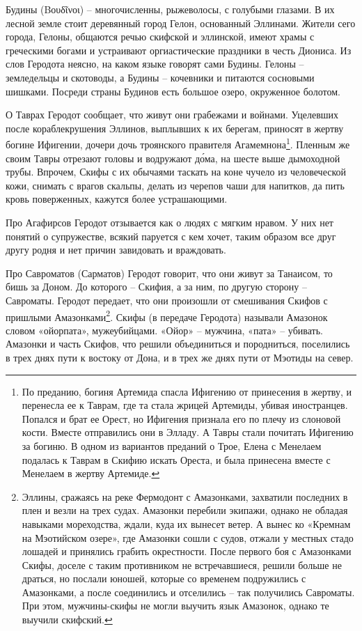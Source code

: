 Будины (Βουδῖνοι) – многочисленны, рыжеволосы, с голубыми глазами. В их лесной земле стоит деревянный город Гелон, основанный Эллинами. Жители сего города, Гелоны, общаются речью скифской и эллинской, имеют храмы с греческими богами и устраивают оргиастические праздники в честь Диониса. Из слов Геродота неясно, на каком языке говорят сами Будины. Гелоны – земледельцы и скотоводы, а Будины – кочевники и питаются сосновыми шишками. Посреди страны Будинов есть большое озеро, окруженное болотом.

О Таврах Геродот сообщает, что живут они грабежами и войнами. Уцелевших после кораблекрушения Эллинов, выплывших к их берегам, приносят в жертву богине Ифигении, дочери дочь троянского правителя Агамемнона\footnote{По преданию, богиня Артемида спасла Ифигению от принесения в жертву, и перенесла ее к Таврам, где та стала жрицей Артемиды, убивая иностранцев. Попался и брат ее Орест, но Ифигения признала его по плечу из слоновой кости. Вместе отправились они в Элладу. А Тавры стали почитать Ифигению за богиню. В одном из вариантов преданий о Трое, Елена с Менелаем подалась к Таврам в Скифию искать Ореста, и была принесена вместе с Менелаем в жертву Артемиде.}. Пленным же своим Тавры отрезают головы и водружают д\'ома, на шесте выше дымоходной трубы. Впрочем, Скифы с их обычаями таскать на коне чучело из человеческой кожи, снимать с врагов скальпы, делать из черепов чаши для напитков, да пить кровь поверженных, кажутся более устрашающими.

Про Агафирсов Геродот отзывается как о людях с мягким нравом. У них нет понятий о супружестве, всякий паруется с кем хочет, таким образом все друг другу родня и нет причин  завидовать и враждовать.

Про Савроматов (Сарматов) Геродот говорит, что они живут за Танаисом, то бишь за Доном. До которого – Скифия, а за ним, по другую сторону – Савроматы. Геродот передает, что они произошли от смешивания Скифов с пришлыми Амазонками\footnote{Эллины, сражаясь на реке Фермодонт с Амазонками, захватили последних в плен и везли на трех судах. Амазонки перебили экипажи, однако не обладая навыками мореходства, ждали, куда их вынесет ветер. А вынес ко «Кремнам на Мэотийском озере», где Амазонки сошли с судов, отжали у местных стадо лошадей и принялись грабить окрестности. После первого боя с Амазонками Скифы, доселе с таким противником не встречавшиеся, решили больше не драться, но послали юношей, которые со временем подружились с Амазонками, а после соединились и отселились – так получились Савроматы. При этом, мужчины-скифы не могли выучить язык Амазонок, однако те выучили скифский.}. Скифы (в передаче Геродота) называли Амазонок словом «ойорпата», мужеубийцами. «Ойор» – мужчина, «пата» – убивать. Амазонки и часть Скифов, что решили объединиться и породниться, поселились в трех днях пути к востоку от Дона, и в трех же днях пути от Мэотиды на север. 

